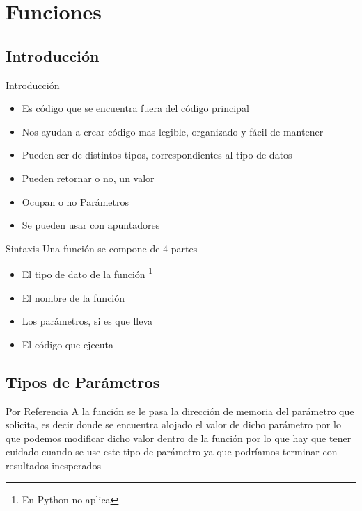 \documentclass{beamer}
\begin{document}
\section{Funciones}

\subsection{Introducci\'on}

\begin{frame}{Introducci\'on}
	\begin{itemize}
		\item Es c\'odigo que se encuentra fuera del c\'odigo principal
		\item Nos ayudan a crear c\'odigo mas legible, organizado y f\'acil de mantener
		\item Pueden ser de distintos tipos, correspondientes al tipo de datos
		\item Pueden retornar o no, un valor
		\item Ocupan o no Par\'ametros
		\item Se pueden usar con apuntadores
	\end{itemize}
\end{frame}

\begin{frame}{Sintaxis}
	Una funci\'on se compone de 4 partes
	\begin{itemize}
		\item El tipo de dato de la funci\'on \footnote{En Python no aplica}
		\item El nombre de la funci\'on
		\item Los par\'ametros, si es que lleva
		\item El c\'odigo que ejecuta
	\end{itemize}
\end{frame}

\subsection{Tipos de Par\'ametros}

\begin{frame}{Por Referencia}
	A la funci\'on se le pasa la direcci\'on de memoria del par\'ametro que solicita, es decir donde se encuentra alojado el valor de dicho par\'ametro por lo que podemos modificar dicho valor dentro de la funci\'on por lo que hay que tener cuidado cuando se use este tipo de par\'ametro ya que podr\'iamos terminar con resultados inesperados
\end{frame}
\end{document}
